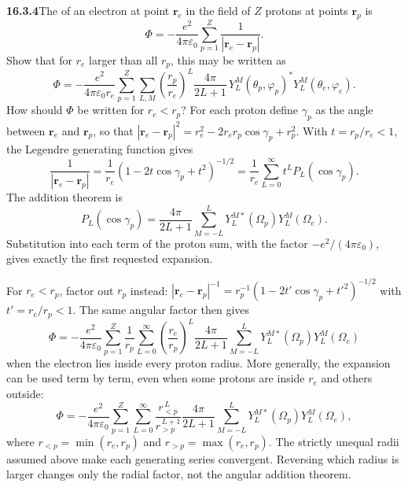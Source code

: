 \par\bigskip
\noindent\textbf{16.3.4}\quad The  of an electron at point
$\mathbf{r}_{e}$ in the field of $Z$ protons at points
$\mathbf{r}_{p}$ is
\[
\Phi=-\frac{e^{2}}{4\pi\varepsilon_{0}}
\sum_{p=1}^{Z}\frac{1}{|\mathbf{r}_{e}-\mathbf{r}_{p}|}.
\]
Show that for $r_{e}$ larger than all $r_{p}$, this may be written as
\[
\Phi=-\frac{e^{2}}{4\pi\varepsilon_{0}r_{e}}
\sum_{p=1}^{Z}\sum_{L,M}\left(\frac{r_{p}}{r_{e}}\right)^{L}
\frac{4\pi}{2L+1}\,
Y_{L}^{M}(\theta_{p},\varphi_{p})^{*}Y_{L}^{M}(\theta_{e},\varphi_{e}).
\]
How should $\Phi$ be written for $r_{e}<r_{p}$?
\solution
{}
For each proton define $\gamma_p$ as the angle between
$\mathbf r_e$ and $\mathbf r_p$, so that
$|\mathbf r_e-\mathbf r_p|^2=r_e^2-2r_er_p\cos\gamma_p+r_p^2$.
With $t=r_p/r_e<1$, the Legendre generating function gives
\[
\frac1{|\mathbf r_e-\mathbf r_p|}
=\frac1{r_e}(1-2t\cos\gamma_p+t^2)^{-1/2}
=\frac1{r_e}\sum_{L=0}^{\infty}t^LP_L(\cos\gamma_p).
\]
The addition theorem is
\[
P_L(\cos\gamma_p)=\frac{4\pi}{2L+1}
\sum_{M=-L}^{L}Y_L^{M*}(\Omega_p)Y_L^M(\Omega_e).
\]
Substitution into each term of the proton sum, with the factor
$-e^2/(4\pi\varepsilon_0)$, gives exactly the first requested
expansion.

For $r_e<r_p$, factor out $r_p$ instead:
$|\mathbf r_e-\mathbf r_p|^{-1}
=r_p^{-1}(1-2t'\cos\gamma_p+t'^2)^{-1/2}$ with $t'=r_e/r_p<1$.
The same angular factor then gives
\[
\boxed{\Phi=-\frac{e^2}{4\pi\varepsilon_0}
\sum_{p=1}^{Z}\frac1{r_p}
\sum_{L=0}^{\infty}\left(\frac{r_e}{r_p}\right)^L
\frac{4\pi}{2L+1}\sum_{M=-L}^{L}
Y_L^{M*}(\Omega_p)Y_L^M(\Omega_e)}
\]
when the electron lies inside every proton radius. More generally,
the expansion can be used term by term, even when some protons
are inside $r_e$ and others outside:
\[
\boxed{\Phi=-\frac{e^2}{4\pi\varepsilon_0}
\sum_{p=1}^{Z}\sum_{L=0}^{\infty}
\frac{r_{<p}^{\,L}}{r_{>p}^{\,L+1}}\frac{4\pi}{2L+1}
\sum_{M=-L}^{L}Y_L^{M*}(\Omega_p)Y_L^M(\Omega_e)},
\]
where $r_{<p}=\min(r_e,r_p)$ and $r_{>p}=\max(r_e,r_p)$.
The strictly unequal radii assumed above make each generating
series convergent. Reversing which radius is larger changes only
the radial factor, not the angular addition theorem.

